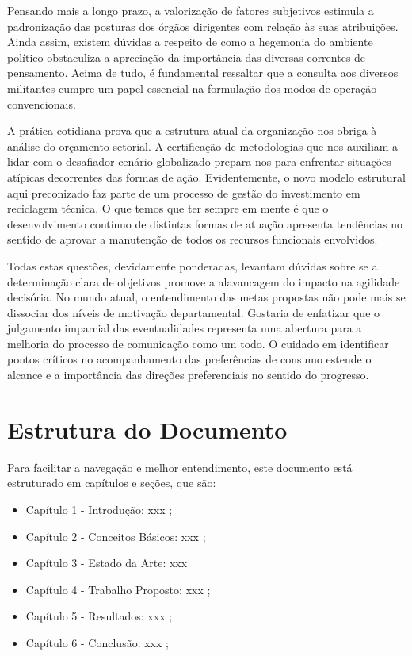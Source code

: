Pensando mais a longo prazo, a valorização de fatores subjetivos estimula a padronização das posturas dos órgãos dirigentes com relação às suas atribuições. Ainda assim, existem dúvidas a respeito de como a hegemonia do ambiente político obstaculiza a apreciação da importância das diversas correntes de pensamento. Acima de tudo, é fundamental ressaltar que a consulta aos diversos militantes cumpre um papel essencial na formulação dos modos de operação convencionais.

A prática cotidiana prova que a estrutura atual da organização nos obriga à análise do orçamento setorial. A certificação de metodologias que nos auxiliam a lidar com o desafiador cenário globalizado prepara-nos para enfrentar situações atípicas decorrentes das formas de ação. Evidentemente, o novo modelo estrutural aqui preconizado faz parte de um processo de gestão do investimento em reciclagem técnica. O que temos que ter sempre em mente é que o desenvolvimento contínuo de distintas formas de atuação apresenta tendências no sentido de aprovar a manutenção de todos os recursos funcionais envolvidos.

Todas estas questões, devidamente ponderadas, levantam dúvidas sobre se a determinação clara de objetivos promove a alavancagem do impacto na agilidade decisória. No mundo atual, o entendimento das metas propostas não pode mais se dissociar dos níveis de motivação departamental. Gostaria de enfatizar que o julgamento imparcial das eventualidades representa uma abertura para a melhoria do processo de comunicação como um todo. O cuidado em identificar pontos críticos no acompanhamento das preferências de consumo estende o alcance e a importância das direções preferenciais no sentido do progresso.

\section{Estrutura do Documento}

Para facilitar a navegação e melhor entendimento, este documento está
estruturado em capítulos e seções, que são:
\begin{itemize}
\item {Capítulo 1 - Introdução}: xxx \cite{Yu:2004:ESG:1015090.1015207};
\item {Capítulo 2 - Conceitos Básicos}: xxx \cite{Cormen:2009};
\item {Capítulo 3 - Estado da Arte}: xxx \cite{Weicker:1984:DSS:358274.358283}
\item {Capítulo 4 - Trabalho Propost}o: xxx \cite{IEEE_802_11:6178212};
\item {Capítulo 5 - Resultados}: xxx \cite{Linux:402081};
\item {Capítulo 6 - Conclusão}: xxx \cite{SBC:2012};
\end{itemize}